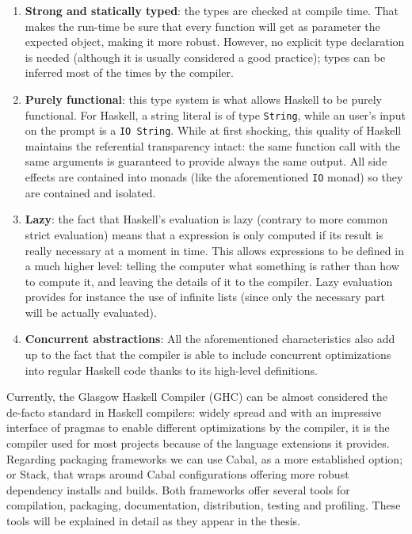 \begin{enumerate}
\item \textbf{Strong and statically typed}: the types are checked at compile
  time. That makes the run-time be sure that every function will get as
  parameter the expected object, making it more robust. However, no explicit
  type declaration is needed (although it is usually considered a good
  practice); types can be inferred most of the times by the compiler.
\item \textbf{Purely functional}: this type system is what allows Haskell to be
  purely functional. For Haskell, a string literal is of type \texttt{String},
  while an user's input on the prompt is a \texttt{IO String}. While at first
  shocking, this quality of Haskell maintains the referential transparency
  intact: the same function call with the same arguments is guaranteed to
  provide always the same output. All side effects are contained into monads
  (like the aforementioned \texttt{IO} monad) so they are contained and
  isolated.
\item \textbf{Lazy}: the fact that Haskell's evaluation is lazy (contrary to
  more common strict evaluation) means that a expression is only computed if
  its result is really necessary at a moment in time. This allows expressions
  to be defined in a much higher level: telling the computer what something is
  rather than how to compute it, and leaving the details of it to the compiler.
  Lazy evaluation provides for instance the use of infinite lists (since only
  the necessary part will be actually evaluated).
\item \textbf{Concurrent abstractions}: All the aforementioned characteristics
  also add up to the fact that the compiler is able to include concurrent
  optimizations into regular Haskell code thanks to its high-level definitions.
\end{enumerate}

Currently, the Glasgow Haskell Compiler (GHC) can be almost considered the
de-facto standard in Haskell compilers: widely spread and with an impressive
interface of pragmas to enable different optimizations by the compiler, it is
the compiler used for most projects because of the language extensions it
provides. Regarding packaging frameworks we can use Cabal, as a more
established option; or Stack, that wraps around Cabal configurations offering
more robust dependency installs and builds. Both frameworks offer several tools
for compilation, packaging, documentation, distribution, testing and profiling.
These tools will be explained in detail as they appear in the thesis.\\

